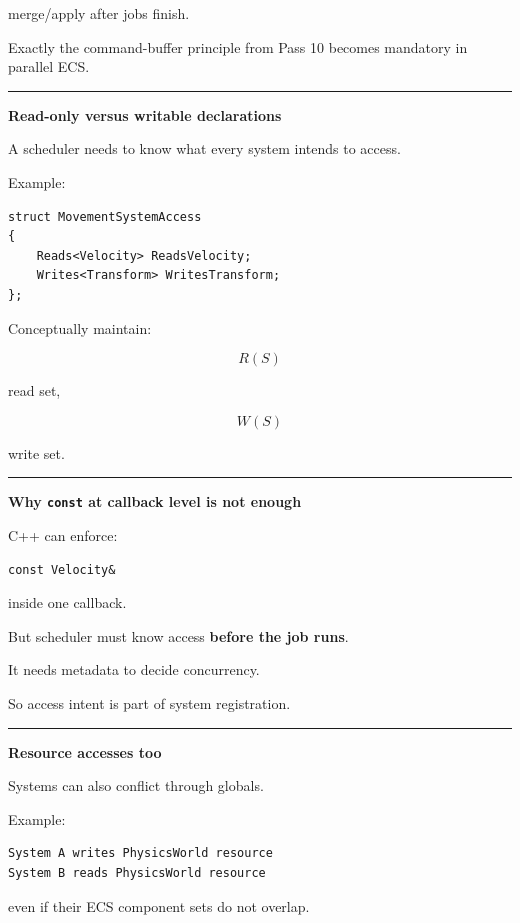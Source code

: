 merge/apply after jobs finish.

Exactly the command-buffer principle from Pass 10 becomes mandatory in parallel ECS.

\begin{center}\rule{0.5\linewidth}{0.5pt}\end{center}

\textbf{Read-only versus writable declarations}

A scheduler needs to know what every system intends to access.

Example:

\begin{verbatim}
struct MovementSystemAccess
{
    Reads<Velocity> ReadsVelocity;
    Writes<Transform> WritesTransform;
};
\end{verbatim}

Conceptually maintain:

\[
R(S)
\]

read set,

\[
W(S)
\]

write set.

\begin{center}\rule{0.5\linewidth}{0.5pt}\end{center}

\textbf{Why \texttt{const} at callback level is not enough}

C++ can enforce:

\begin{verbatim}
const Velocity&
\end{verbatim}

inside one callback.

But scheduler must know access \textbf{before the job runs}.

It needs metadata to decide concurrency.

So access intent is part of system registration.

\begin{center}\rule{0.5\linewidth}{0.5pt}\end{center}

\textbf{Resource accesses too}

Systems can also conflict through globals.

Example:

\begin{verbatim}
System A writes PhysicsWorld resource
System B reads PhysicsWorld resource
\end{verbatim}

even if their ECS component sets do not overlap.

